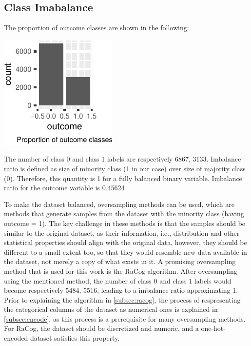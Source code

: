 \documentclass{article}
\begin{document}
\hypertarget{class-imabalance}{%
\subsection{\texorpdfstring{Class Imabalance
\label{subsec:imbalance}}{Class Imabalance }}\label{class-imabalance}}

The proportion of outcome classes are shown in the following:

\begin{center}\includegraphics{report_files/figure-latex/unnamed-chunk-8-1} \end{center}

The number of class 0 and class 1 labels are respectively 6867, 3133.
Imbalance ratio is defined as size of minority class (1 in our case)
over size of majority class (0). Therefore, this quantity is 1 for a
fully balanced binary variable. Imbalance ratio for the outcome variable
is 0.45624

To make the dataset balanced, oversampling methods can be used, which
are methods that generate samples from the dataset with the minority
class (having outcome = 1). The key challenge in these methods is that
the samples should be similar to the original dataset, as their
information, i.e., distribution and other statistical properties should
align with the original data, however, they should be different to a
small extent too, so that they would resemble new data available in the
dataset, not merely a copy of what exists in it. A promising
oversampling method that is used for this work is the RaCog algorithm.
After oversampling using the mentioned method, the number of class 0 and
class 1 labels would become respectively 5484, 5516, leading to a
imbalance ratio approximating 1. Prior to explaining the algorithm in
\ref{subsec:racog}, the process of respresenting the categorical columns
of the dataset as numerical ones is explained in \ref{subsec:encode}, as
this process is a prerequisite for many oversampling methods. For RaCog,
the dataset should be discretized and numeric, and a one-hot-encoded
dataset satisfies this property.
\end{document}
